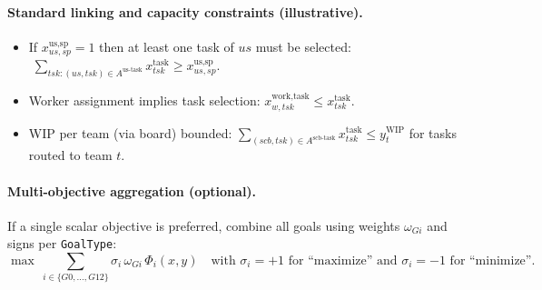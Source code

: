 \documentclass[11pt,a4paper]{article}
\begin{document}
\paragraph{Standard linking and capacity constraints (illustrative).}
\begin{itemize}
  \item If $x^{\text{us,sp}}_{us,sp}=1$ then at least one task of $us$ must be selected: 
  $\;\sum_{tsk:(us,tsk)\in A^{\text{us-task}}} x^{\text{task}}_{tsk} \ge x^{\text{us,sp}}_{us,sp}$.
  \item Worker assignment implies task selection: $x^{\text{work,task}}_{w,tsk} \le x^{\text{task}}_{tsk}$.
  \item WIP per team (via board) bounded: $\sum_{(scb,tsk)\in A^{\text{scb-task}}} x^{\text{task}}_{tsk} \le y^{\text{WIP}}_{t}$ for tasks routed to team $t$.
\end{itemize}

\paragraph{Multi-objective aggregation (optional).} If a single scalar objective is preferred, combine all goals using weights $\omega_{Gi}$ and signs per \texttt{GoalType}:
\[
\max \ \sum_{i\in\{G0,\ldots,G12\}} \sigma_i \, \omega_{Gi}\, \Phi_i(x,y) \quad \text{with } \sigma_i=+1 \text{ for ``maximize'' and } \sigma_i=-1 \text{ for ``minimize''}.
\]
\end{document}
